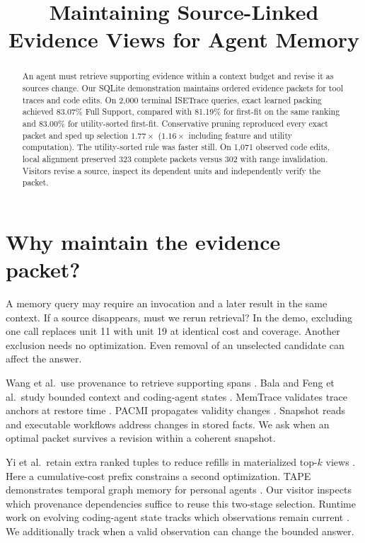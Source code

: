 \documentclass[conference]{IEEEtran}
\title{Maintaining Source-Linked Evidence Views for Agent Memory}
\author{\IEEEauthorblockN{Anonymous authors}}
\begin{document}
\maketitle
\begin{abstract}
An agent must retrieve supporting evidence within a context budget and revise it as sources change. Our SQLite demonstration maintains ordered evidence packets for tool traces and code edits. On 2,000 terminal ISETrace queries, exact learned packing achieved 83.07\% Full Support, compared with 81.19\% for first-fit on the same ranking and 83.00\% for utility-sorted first-fit. Conservative pruning reproduced every exact packet and sped up selection $1.77\times$ ($1.16\times$ including feature and utility computation). The utility-sorted rule was faster still. On 1,071 observed code edits, local alignment preserved 323 complete packets versus 302 with range invalidation. Visitors revise a source, inspect its dependent units and independently verify the packet.

\end{abstract}

\section{Why maintain the evidence packet?}

A memory query may require an invocation and a later result in the same context. If a source disappears, must we rerun retrieval? In the demo, excluding one call replaces unit 11 with unit 19 at identical cost and coverage. Another exclusion needs no optimization. Even removal of an unselected candidate can affect the answer.

Wang et al.\ use provenance to retrieve supporting spans \cite{wang}. Bala and Feng et al.\ study bounded context and coding-agent states \cite{bala,feng}. MemTrace validates trace anchors at restore time \cite{memtrace}. PACMI propagates validity changes \cite{pacmi}. Snapshot reads \cite{readboundaries} and executable workflows \cite{changes} address changes in stored facts. We ask when an optimal packet survives a revision within a coherent snapshot.

Yi et al.\ retain extra ranked tuples to reduce refills in materialized top-$k$ views \cite{topk}. Here a cumulative-cost prefix constrains a second optimization. TAPE demonstrates temporal graph memory for personal agents \cite{tape}. Our visitor inspects which provenance dependencies suffice to reuse this two-stage selection. Runtime work on evolving coding-agent state tracks which observations remain current \cite{execledger}. We additionally track when a valid observation can change the bounded answer.
\end{document}
